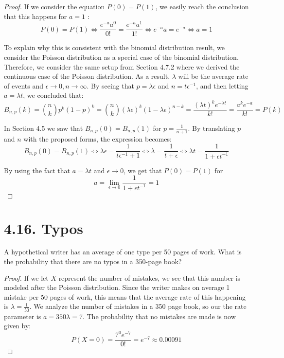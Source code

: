 \vspace{1em}

\begin{proof}
    If we consider the equation $P(0) = P(1)$, we easily reach the conclusion that this happens for 
    $a = 1$ :
    \[
        P(0) = P(1) \iff \frac{e^{-a}a^0}{0!} = \frac{e^{-a}a^1}{1!} \iff e^{-a} a = e^{-a} \iff a = 1
    \] 

    To explain why this is consistent with the binomial distribution result, we consider
    the Poisson distribution as a special case of the binomial distribution. 
    Therefore, we consider the same setup from Section 4.7.2 where we derived the continuous case
    of the Poisson distribution. As a result, $\lambda$ will be the average rate of events
    and $\epsilon \to 0, n \to \infty$. By seeing that $p = \lambda \epsilon$ and $n = t \epsilon^{-1}$, 
    and then letting $a = \lambda t$, we concluded that:
    \[
        B_{n, p}(k) = \binom{n}{k} p^k (1 - p)^k 
        = \binom{n}{k} (\lambda \epsilon)^k (1 - \lambda \epsilon)^{n - k} 
        = \frac{(\lambda t)^k e^{-\lambda t}}{k!}
        = \frac{a^k e^{-a}}{k!}
        = P(k)
    \] 

    In Section 4.5 we saw that $B_{n, p}(0) = B_{n, p}(1)$ for $p = \frac{1}{n + 1}$. 
    By translating $p$ and $n$ with the proposed forms, the expression becomes:
    \[
        B_{n, p}(0) = B_{n, p}(1) 
        \iff \lambda \epsilon = \frac{1}{t \epsilon^{-1} + 1}
        \iff \lambda = \frac{1}{t + \epsilon}
            \iff \lambda t = \frac{1}{1 + \epsilon t^{-1}}
    \]

    By using the fact that $a = \lambda t$ and  $\epsilon \to 0$, we get that $P(0) = P(1)$ 
    for 
    \[
        a = \lim_{\epsilon \to 0} \frac{1}{1 + \epsilon t^{-1}} = 1
    \] 
\end{proof}

\section*{4.16. Typos}
A hypothetical writer has an average of one type per 50 pages of work. What is the
probability that there are no typos in a 350-page book?

\vspace{1em}

\begin{proof}
    If we let $X$ represent the number of mistakes, we see that this number is 
    modeled after the Poisson distribution. Since the writer makes on average 1 
    mistake per 50 pages of work, this means that the average rate of this happening 
    is $\lambda = \frac{1}{50}$. We analyze the number of mistakes in a 350 page book, 
    so our the rate parameter is $a = 350\lambda = 7$. The probability that
    no mistakes are made is now given by:
    \[
        P(X = 0) = \frac{7^0 e^{-7}}{0!} = e^{-7} \approx 0.00091
    \] 
\end{proof}

